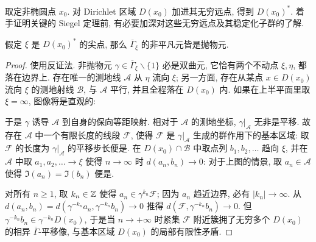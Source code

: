 取定非椭圆点 $x_0$. 对 Dirichlet 区域 $D(x_0)$ 加进其无穷远点, 得到 $D(x_0)^*$. 着手证明关键的 Siegel 定理前, 有必要加深对这些无穷远点及其稳定化子群的了解.
\begin{lemma}\label{prop:parabolic-stabilizer-aux}
	假定 $\xi$ 是 $D(x_0)^*$ 的尖点, 那么 $\overline{\Gamma}_\xi$ 的非平凡元皆是抛物元.
\end{lemma}
\begin{proof}
	使用反证法. 非抛物元 $\gamma \in \overline{\Gamma}_\xi \smallsetminus \{1\}$ 必是双曲元, 它恰有两个不动点 $\xi, \eta$, 都落在边界上. 存在唯一的测地线 $\mathcal{A}$ 从 $\eta$ 流向 $\xi$; 另一方面, 存在从某点 $x \in D(x_0)$ 流向 $\xi$ 的测地射线 $\mathcal{B}$, 与 $\mathcal{A}$ 平行, 并且全程落在 $D(x_0)$ 内. 如果在上半平面里取 $\xi = \infty$, 图像将是直观的:
	\begin{center}\end{center}

	于是 $\gamma$ 诱导 $\mathcal{A}$ 到自身的保向等距映射. 相对于 $\mathcal{A}$ 的测地坐标, $\gamma|_{\mathcal{A}}$ 无非是平移. 故存在 $\mathcal{A}$ 中一个有限长度的线段 $\mathcal{F}$, 使得 $\mathcal{F}$ 是 $\gamma|_{\mathcal{A}}$ 生成的群作用下的基本区域: 取 $\mathcal{F}$ 的长度为 $\gamma|_{\mathcal{A}}$ 的平移步长便是. 在 $D(x_0) \cap \mathcal{B}$ 中取点列 $b_1, b_2, \ldots$ 趋向 $\xi$, 并在 $\mathcal{A}$ 中取 $a_1, a_2, \ldots \to \xi$ 使得 $n \to \infty$ 时 $d(a_n, b_n) \to 0$: 对于上图的情景, 取 $a_n \in \mathcal{A}$ 使得 $\Im(a_n) = \Im(b_n)$ 便是.
	
	对所有 $n \geq 1$, 取 $k_n \in \mathbb{Z}$ 使得 $a_n \in \gamma^{k_n} \mathcal{F}$; 因为 $a_n$ 趋近边界, 必有 $|k_n| \to \infty$. 从 $d(a_n, b_n) = d\left( \gamma^{-k_n} a_n, \gamma^{-k_n} b_n \right) \to 0$ 推得 $d\left(\mathcal{F}, \gamma^{-k_n} b_n \right) \to 0$. 但 $\gamma^{-k_n} b_n \in \gamma^{-k_n} D(x_0)$, 于是当 $n \to +\infty$ 时紧集 $\mathcal{F}$ 附近簇拥了无穷多个 $D(x_0)$ 的相异 $\overline{\Gamma}$-平移像, 与基本区域 $D(x_0)$ 的局部有限性矛盾.
\end{proof}

